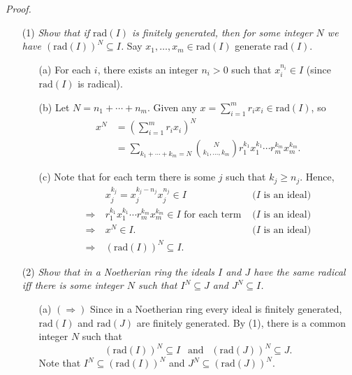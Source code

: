 \documentclass{article}
\begin{document}
\emph{Proof.}
\begin{enumerate}
  \item[(1)]
  \emph{Show that if $\mathrm{rad}(I)$ is finitely generated,
  then for some integer $N$ we have $(\mathrm{rad}(I))^N \subseteq I$.}
  Say $x_1, \ldots, x_m \in \mathrm{rad}(I)$ generate $\mathrm{rad}(I)$.
  \begin{enumerate}
    \item[(a)]
    For each $i$, there exists an integer $n_i > 0$ such that $x_i^{n_i} \in I$
    (since $\mathrm{rad}(I)$ is radical).
    \item[(b)]
    Let $N = n_1 + \cdots + n_m$.
    Given any $x = \sum_{i=1}^{m} r_i x_i \in \mathrm{rad}(I)$,
    so
    \begin{align*}
      x^N
      &= \left( \sum_{i=1}^{m} r_i x_i \right)^{N} \\
      &= \sum_{k_1 + \cdots + k_m = N} {N \choose k_1,\ldots,k_m}
        r_1^{k_1} x_1^{k_1} \cdots r_m^{k_m} x_m^{k_m}.
    \end{align*}
    \item[(c)]
    Note that for each term there is some $j$ such that $k_j \geq n_j$.
    Hence,
    \begin{align*}
      & \: x_j^{k_j} = x_j^{k_j-n_j} x_j^{n_j} \in I
        &\text{($I$ is an ideal)} \\
      \Longrightarrow& \:
      r_1^{k_1} x_1^{k_1} \cdots r_m^{k_m} x_m^{k_m} \in I \text{ for each term }
        &\text{($I$ is an ideal)} \\
      \Longrightarrow& \:
      x^N \in I.
        &\text{($I$ is an ideal)} \\
      \Longrightarrow& \:
        (\mathrm{rad}(I))^N \subseteq I.
    \end{align*}
  \end{enumerate}
  \item[(2)]
  \emph{Show that in a Noetherian ring the ideals $I$ and $J$ have the same radical
  iff there is some integer $N$ such that $I^N \subseteq J$ and $J^N \subseteq I$.}
  \begin{enumerate}
    \item[(a)]
    $(\Longrightarrow)$
    Since in a Noetherian ring every ideal is finitely generated,
    $\mathrm{rad}(I)$ and $\mathrm{rad}(J)$ are finitely generated.
    By (1), there is a common integer $N$ such that
    \[
      (\mathrm{rad}(I))^N \subseteq I \:\: \text{ and } \:\:
      (\mathrm{rad}(J))^N \subseteq J.
    \]
    Note that $I^N \subseteq (\mathrm{rad}(I))^N$ and $J^N \subseteq (\mathrm{rad}(J))^N$.

\end{enumerate}
\end{enumerate}
\end{document}
